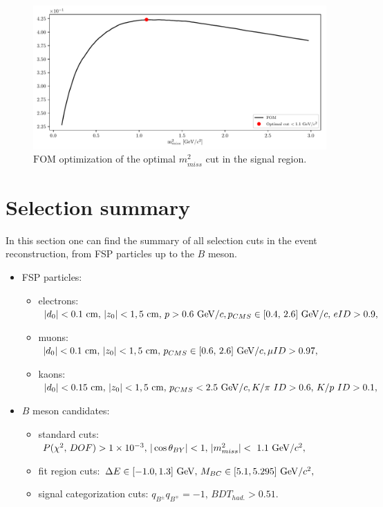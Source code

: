 \begin{figure}[H]
\centering
\captionsetup{width=0.8\linewidth}
\includegraphics[width=\linewidth]{fig/missm2_opt}
\caption{$\mathrm{FOM}$ optimization of the optimal $m_{miss}^2$ cut in the signal region.}
\label{fig:missm2opt}
\end{figure}

\section{Selection summary}
\label{s:ss}
In this section one can find the summary of all selection cuts in the event reconstruction, from FSP particles up to the $B$ meson.

\begin{itemize}
\item FSP particles:
	\begin{itemize}
	\item electrons: $\vert d_0 \vert < 0.1\mathrm{~cm},\,\vert z_0 \vert < 1,5\mathrm{~cm},\,p>0.6\mathrm{~GeV}/c,\\p_{CMS}\in[0.4,\,2.6]\mathrm{~GeV}/c,\,eID>0.9,$
    \item muons: $\vert d_0 \vert < 0.1\mathrm{~cm},\,\vert z_0 \vert < 1,5\mathrm{~cm},\,p_{CMS}\in[0.6,\,2.6]\mathrm{~GeV}/c,\\\mu ID>0.97,$
    \item kaons: $\vert d_0 \vert < 0.15\mathrm{~cm},\,\vert z_0 \vert < 1,5\mathrm{~cm},\,p_{CMS} < 2.5\mathrm{~GeV}/c,\\K/\pi~ID>0.6,\,K/p~ID>0.1,$
	\end{itemize}
\item $B$ meson candidates:
	\begin{itemize}
	\item standard cuts: $P(\chi^2,\,DOF) > 1\times 10^{-3},\,\vert \cos \theta_{BY} \vert < 1,\,\vert m_{miss}^2\vert<~1.1\mathrm{~GeV}/c^2,$
    \item fit region cuts: $\Delta E \in [-1.0,1.3]\mathrm{~GeV},\,M_{BC} \in [5.1,5.295]\mathrm{~GeV}/c^2,$
    \item signal categorization cuts: $q_{B^\pm}q_{B^\mp} = -1,\,BDT_{had.} > 0.51.$
	\end{itemize}
\end{itemize}